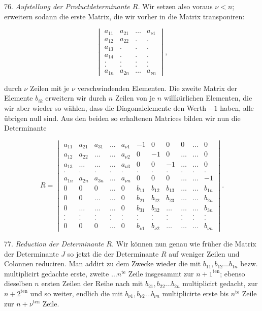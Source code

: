 \documentclass[11pt]{article}
\begin{document}
76. \textit{Aufstellung der Productdeterminante $R$.} Wir setzen also voraus $\nu < n$; erweitern sodann die erste Matrix, die wir vorher in die Matrix transponiren:

\[
\begin{vmatrix}
a_{11} & a_{21} & \ldots & a_{\nu 1}\\
a_{12} & a_{22} & . & .\\
a_{13} & . & . & .\\
a_{14} & . & . & .\\
. & . & . & .\\
. & . & . & .\\
a_{1n} & a_{2n} & \ldots & a_{\nu n}
\end{vmatrix},
\]

durch $\nu$ Zeilen mit je $\nu$ verschwindenden Elementen. Die zweite Matrix der Elemente $b_{ik}$ erweitern wir durch $n$ Zeilen von je $n$ willkürlichen Elementen, die wir aber wieder so wählen, dass die Diagonalelemente den Werth $-1$ haben, alle übrigen null sind. Aus den beiden so erhaltenen Matrices bilden wir nun die Determinante

\[
R =
\begin{vmatrix}
a_{11} & a_{21} & a_{31} & \ldots & a_{\nu 1} & -1 & 0 & 0 & 0 & \ldots & 0\\
a_{12} & a_{22} & \ldots & \ldots & a_{\nu 2} & 0 & -1 & 0 & \ldots & \ldots & 0\\
a_{13} & \ldots & \ldots & \ldots & a_{\nu 3} & 0 & 0 & -1 & \ldots & \ldots & 0\\
. & . & . & . & . & . & . & . & . & . & .\\
a_{1n} & a_{2n} & a_{3n} & \ldots & a_{\nu n} & 0 & 0 & 0 & \ldots & \ldots & -1\\
0 & 0 & 0 & \ldots & 0 & b_{11} & b_{12} & b_{13} & \ldots & \ldots & b_{1n}\\
0 & 0 & \ldots & \ldots & 0 & b_{21} & b_{22} & b_{23} & \ldots & \ldots & b_{2n}\\
0 & \ldots & \ldots & \ldots & 0 & b_{31} & b_{32} & \ldots & \ldots & \ldots & b_{3n}\\
. & . & . & . & . & . & . & . & . & . & .\\
. & . & . & . & . & . & . & . & . & . & .\\
0 & 0 & 0 & \ldots & 0 & b_{\nu 1} & b_{\nu 2} & \ldots & \ldots & \ldots & b_{\nu n}
\end{vmatrix}.
\]

77. \textit{Reduction der Determinante $R$.} Wir können nun genau wie früher die Matrix der Determinante $J$ so jetzt die der Determinante $R$ auf weniger Zeilen und Colonnen reduciren. Man addirt zu dem Zwecke wieder die mit $b_{11}, b_{12} \ldots b_{1n}$ bezw. multiplicirt gedachte erste, zweite $\ldots n^{\mathrm{te}}$ Zeile insgesammt zur $n+1^{\mathrm{ten}}$; ebenso dieselben $n$ ersten Zeilen der Reihe nach mit $b_{21}, b_{22} \ldots b_{2n}$ multiplicirt gedacht, zur $n+2^{\mathrm{ten}}$ und so weiter, endlich die mit $b_{\nu 1}, b_{\nu 2} \ldots b_{\nu n}$ multiplicirte erste bis $n^{\mathrm{te}}$ Zeile zur $n+\nu^{\mathrm{ten}}$ Zeile.
\end{document}
